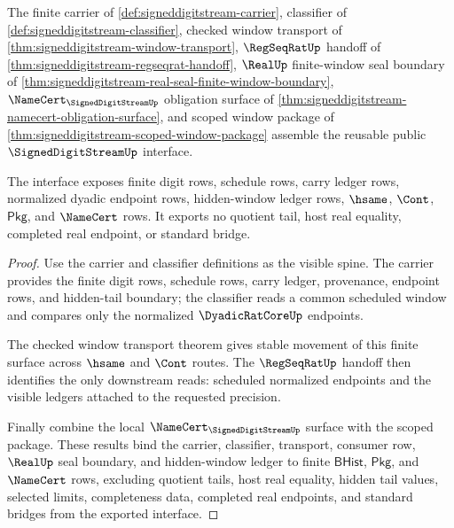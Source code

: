 \begin{theorem}
\label{thm:signeddigitstream-public-interface-export}
The finite carrier of \autoref{def:signeddigitstream-carrier}, classifier of \autoref{def:signeddigitstream-classifier}, checked window transport of \autoref{thm:signeddigitstream-window-transport}, $\RegSeqRatUp$ handoff of \autoref{thm:signeddigitstream-regseqrat-handoff}, $\RealUp$ finite-window seal boundary of \autoref{thm:signeddigitstream-real-seal-finite-window-boundary}, $\NameCert_{\SignedDigitStreamUp}$ obligation surface of \autoref{thm:signeddigitstream-namecert-obligation-surface}, and scoped window package of \autoref{thm:signeddigitstream-scoped-window-package} assemble the reusable public $\SignedDigitStreamUp$ interface.

The interface exposes finite digit rows, schedule rows, carry ledger rows, normalized dyadic endpoint rows, hidden-window ledger rows, $\hsame$, $\Cont$, $\mathsf{Pkg}$, and $\NameCert$ rows. It exports no quotient tail, host real equality, completed real endpoint, or standard bridge.
\end{theorem}
\begin{proof}
Use the carrier and classifier definitions as the visible spine. The carrier provides the finite digit rows, schedule rows, carry ledger, provenance, endpoint rows, and hidden-tail boundary; the classifier reads a common scheduled window and compares only the normalized $\DyadicRatCoreUp$ endpoints.

The checked window transport theorem gives stable movement of this finite surface across $\hsame$ and $\Cont$ routes. The $\RegSeqRatUp$ handoff then identifies the only downstream reads: scheduled normalized endpoints and the visible ledgers attached to the requested precision.

Finally combine the local $\NameCert_{\SignedDigitStreamUp}$ surface with the scoped package. These results bind the carrier, classifier, transport, consumer row, $\RealUp$ seal boundary, and hidden-window ledger to finite $\mathsf{BHist}$, $\mathsf{Pkg}$, and $\NameCert$ rows, excluding quotient tails, host real equality, hidden tail values, selected limits, completeness data, completed real endpoints, and standard bridges from the exported interface.
\end{proof}

